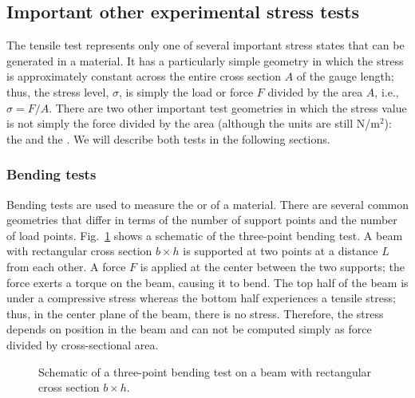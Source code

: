 \subsection{Important other experimental stress tests} 
The tensile test represents only one of several important stress states that can be generated in a material.  It has a particularly simple geometry in which the stress is approximately constant across the entire cross section $A$ of the gauge length; thus, the stress level, $\sigma$, is simply the load or force $F$ divided by the area $A$, i.e., $\sigma = F/A$.  There are two other important test geometries in which the stress value is not simply the force divided by the area (although the units are still N/m$^2$): the  and the .  We will describe both tests in the following sections.

\subsubsection{Bending tests} 
Bending tests are used to measure the  or  of a material.  There are several common geometries that differ in terms of the number of support points and the number of load points. Fig.~\ref{\chabbr:fig:threepointbend} shows a schematic of the three-point bending test. A beam with rectangular cross section $b\times h$ is supported at two points at a distance $L$ from each other.  A force $F$ is applied at the center between the two supports; the force exerts a torque on the beam, causing it to bend.  The top half of the beam is under a compressive stress whereas the bottom half experiences a tensile stress; thus, in the center plane of the beam, there is no stress.  Therefore, the stress depends on position in the beam and can not be computed simply as force divided by cross-sectional area.  

\begin{figure}[h]
\caption{Schematic of a three-point bending test on a beam with rectangular cross section $b\times h$.}
\label{\chabbr:fig:threepointbend}
\end{figure}

